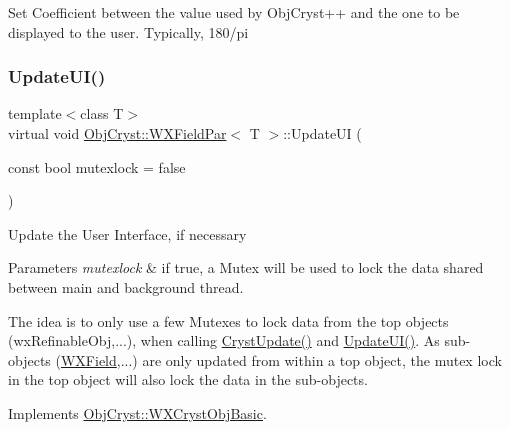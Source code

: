 Set Coefficient between the value used by Obj\+Cryst++ and the one to be displayed to the user. Typically, 180/pi \mbox{\label{class_obj_cryst_1_1_w_x_field_par_a1777f9713ca5d40c29c5bd3ab5484aff}} 
\subsubsection{\texorpdfstring{UpdateUI()}{UpdateUI()}\hspace{0.1cm}{\footnotesize\ttfamily [1/3]}}
{\footnotesize\ttfamily template$<$class T$>$ \\
virtual void \mbox{\hyperlink{class_obj_cryst_1_1_w_x_field_par}{Obj\+Cryst\+::\+W\+X\+Field\+Par}}$<$ T $>$\+::Update\+UI (\begin{DoxyParamCaption}\item[{const bool}]{mutexlock = {\ttfamily false} }\end{DoxyParamCaption})\hspace{0.3cm}{\ttfamily [virtual]}}

Update the User Interface, if necessary


\begin{DoxyParams}{Parameters}
{\em mutexlock} & if true, a Mutex will be used to lock the data shared between main and background thread.\\
\hline
\end{DoxyParams}
The idea is to only use a few Mutexes to lock data from the top objects (wx\+Refinable\+Obj,...), when calling \mbox{\hyperlink{class_obj_cryst_1_1_w_x_field_par_a9cee56b1dc7a9695535c7461be7d9e5f}{Cryst\+Update()}} and \mbox{\hyperlink{class_obj_cryst_1_1_w_x_field_par_a1777f9713ca5d40c29c5bd3ab5484aff}{Update\+U\+I()}}. As sub-\/objects (\mbox{\hyperlink{class_obj_cryst_1_1_w_x_field}{W\+X\+Field}},...) are only updated from within a top object, the mutex lock in the top object will also lock the data in the sub-\/objects. 

Implements \mbox{\hyperlink{class_obj_cryst_1_1_w_x_cryst_obj_basic_a3818940b7031ff7e45cf2178c4a99c90}{Obj\+Cryst\+::\+W\+X\+Cryst\+Obj\+Basic}}.

\mbox{\label{class_obj_cryst_1_1_w_x_field_par_a5ca0e76f414e64005b295719219ff1e7}} 
